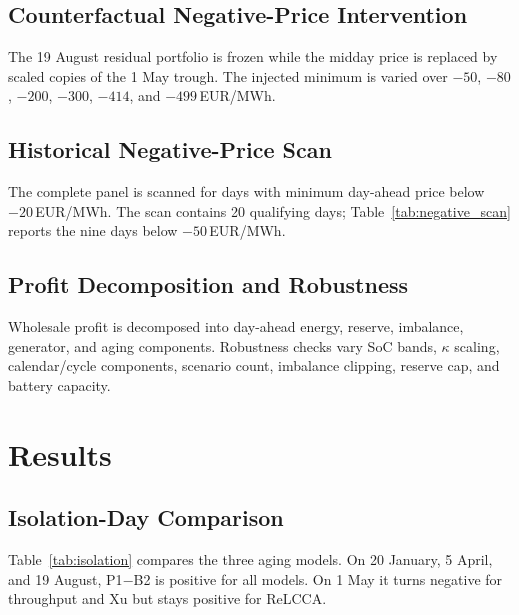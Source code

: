 \documentclass[journal,12pt,twocolumn]{IEEEtran}
\begin{document}
\subsection{Counterfactual Negative-Price Intervention}
The 19 August residual portfolio is frozen while the midday price is replaced by scaled copies of the 1 May trough. The injected minimum is varied over $-50$, $-80$, $-200$, $-300$, $-414$, and $-499$\,EUR/MWh.

\subsection{Historical Negative-Price Scan}
The complete panel is scanned for days with minimum day-ahead price below $-20$\,EUR/MWh. The scan contains 20 qualifying days; Table~\ref{tab:negative_scan} reports the nine days below $-50$\,EUR/MWh.

\subsection{Profit Decomposition and Robustness}
Wholesale profit is decomposed into day-ahead energy, reserve, imbalance, generator, and aging components. Robustness checks vary SoC bands, $\kappa$ scaling, calendar/cycle components, scenario count, imbalance clipping, reserve cap, and battery capacity.

\section{Results}
\label{sec:results}

\subsection{Isolation-Day Comparison}
Table~\ref{tab:isolation} compares the three aging models. On 20 January, 5 April, and 19 August, P1$-$B2 is positive for all models. On 1 May it turns negative for throughput and Xu but stays positive for ReLCCA.
\end{document}
